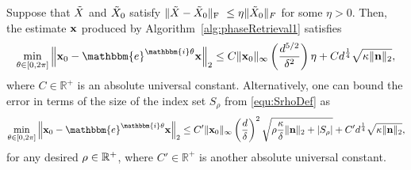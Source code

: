 \begin{theorem}
Suppose that $\tilde{X}$ and $\tilde{X}_0$ satisfy $\Vert \tilde{X} - \tilde{X}_0 \Vert_{\rm F}~\leq \eta \Vert \tilde{X}_0 \Vert_F$ for some $\eta>0$.
Then, the estimate $\mathbf x$ produced by Algorithm~\ref{alg:phaseRetrieval1} satisfies 
\[ \min_{\theta \in [0, 2 \pi]} \left\Vert  \x_0 - \mathbbm{e}^{\mathbbm{i} \theta} \x \right\Vert_2 \leq C \Vert \x_0 
        \Vert_{\infty} \left( \frac{d^{5/2}}{\delta^2} \right) \eta  + C  d^{\frac{1}{4}} \sqrt{\kappa \| \n \|_2 },\]
where $C \in \mathbb{R}^+$ is an absolute universal constant.  Alternatively, one can bound the error in terms of the size of the index set $S_\rho$ from \eqref{equ:SrhoDef} as 
\begin{equation}
\min_{\theta \in [0, 2 \pi]} \left\Vert  \x_0 - \mathbbm{e}^{\mathbbm{i} \theta} \x \right\Vert_2 \leq C' \Vert \x_0 
        \Vert_{\infty} \left( \frac{d}{\delta} \right)^2 \sqrt{\rho \frac{\kappa}{\delta} \| \n \|_2 + \left| S_\rho \right|} + C' d^{\frac{1}{4}} \sqrt{\kappa \| \n \|_2 }, \label{equ:ManRes2} 
\end{equation}
for any desired $\rho \in \mathbb{R}^+$, where $C' \in \mathbb{R}^+$ is another absolute universal constant.
\label{thm:MainRes}
\end{theorem}

